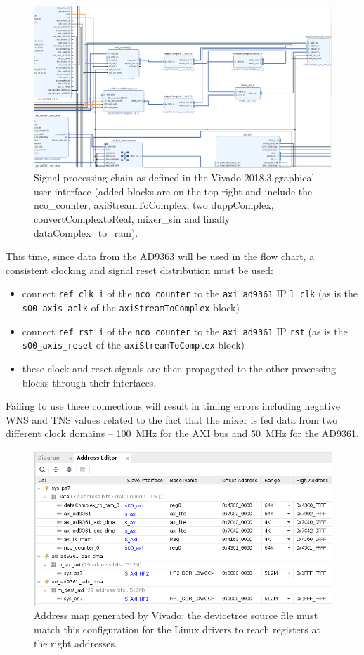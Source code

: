 \documentclass[12pt,oneside]{article}
\begin{document}
\begin{figure}[h!tb]
\includegraphics[width=\linewidth]{2.png}
\caption{Signal processing chain as defined in the Vivado 2018.3 graphical user
interface (added blocks are on the top right and include the nco\_counter, 
axiStreamToComplex, two duppComplex, convertComplextoReal, mixer\_sin and 
finally dataComplex\_to\_ram).}
\label{chain1}
\end{figure}

This time, since data from the AD9363 will be used in the flow chart, a consistent
clocking and signal reset distribution must be used:
\begin{itemize}
\item connect {\tt ref\_clk\_i} of the {\tt nco\_counter} to the {\tt axi\_ad9361} IP
{\tt l\_clk} (as is the {\tt s00\_axis\_aclk} of the {\tt axiStreamToComplex} block)
\item connect {\tt ref\_rst\_i} of the {\tt nco\_counter} to the {\tt axi\_ad9361} IP
{\tt rst} (as is the {\tt s00\_axis\_reset} of the {\tt axiStreamToComplex} block)
\item these clock and reset signals are then propagated to the other processing blocks through
their interfaces.
\end{itemize}

Failing to use these connections will result in timing errors including negative WNS and TNS
values related to the fact that the mixer is fed data from two different clock domains -- 100~MHz
for the AXI bus and 50~MHz for the AD9361.

\begin{figure}[h!tb]
\includegraphics[width=\linewidth]{address.png}
\caption{Address map generated by Vivado: the devicetree source file must match
this configuration for the Linux drivers to reach registers at the right addresses.}
\label{chain2}
\end{figure}
\end{document}
